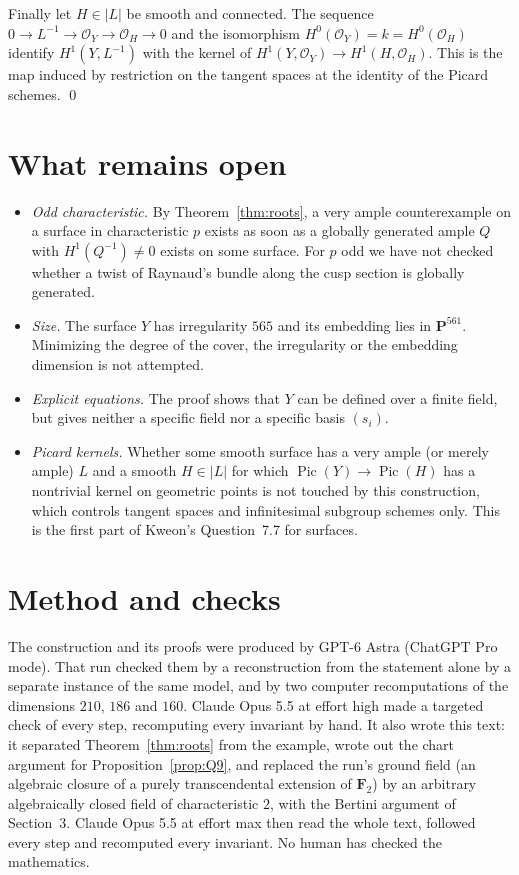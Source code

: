 \documentclass[11pt,a4paper]{article}
\theoremstyle{plain}
\theoremstyle{remark}
\newcommand{\OO}{\mathcal O}
\newcommand{\F}{\mathbf F}
\newcommand{\PP}{\mathbf P}
\newcommand{\Pic}{\operatorname{Pic}}
\begin{document}
Finally let $H\in|L|$ be smooth and connected. The sequence $0\to L^{-1}\to\OO_Y\to\OO_H\to0$ and the isomorphism
$H^0(\OO_Y)=k=H^0(\OO_H)$ identify $H^1(Y,L^{-1})$ with the kernel of $H^1(Y,\OO_Y)\to H^1(H,\OO_H)$. This is the map
induced by restriction on the tangent spaces at the identity of the Picard schemes. \qed

\section{What remains open}

\begin{itemize}
\item \emph{Odd characteristic.} By Theorem~\ref{thm:roots}, a very ample counterexample on a surface in characteristic
$p$ exists as soon as a globally generated ample $Q$ with $H^1(Q^{-1})\ne0$ exists on some surface. For $p$ odd we have
not checked whether a twist of Raynaud's bundle along the cusp section is globally generated.
\item \emph{Size.} The surface $Y$ has irregularity $565$ and its embedding lies in $\PP^{561}$. Minimizing the degree
of the cover, the irregularity or the embedding dimension is not attempted.
\item \emph{Explicit equations.} The proof shows that $Y$ can be defined over a finite field, but gives neither a
specific field nor a specific basis $(s_i)$.
\item \emph{Picard kernels.} Whether some smooth surface has a very ample (or merely ample) $L$ and a smooth
$H\in|L|$ for which $\Pic(Y)\to\Pic(H)$ has a nontrivial kernel on geometric points is not touched by this
construction, which controls tangent spaces and infinitesimal subgroup schemes only. This is the first part of
Kweon's Question~7.7 \cite[p.~19]{Kweon} for surfaces.
\end{itemize}

\section*{Method and checks}

The construction and its proofs were produced by GPT-6 Astra (ChatGPT Pro mode). That run checked them by a
reconstruction from the statement alone by a separate instance of the same model, and by two computer recomputations
of the dimensions $210$, $186$ and $160$. Claude Opus 5.5 at effort high made a targeted check of every step, recomputing
every invariant by hand. It also wrote this text: it separated Theorem~\ref{thm:roots} from the example, wrote out the
chart argument for Proposition~\ref{prop:Q9}, and replaced the run's ground field (an algebraic closure of a purely
transcendental extension of $\F_2$) by an arbitrary algebraically closed field of characteristic $2$, with the Bertini
argument of Section~3. Claude Opus 5.5 at effort max then read the whole text, followed every step and
recomputed every invariant. No human has checked the mathematics.
\end{document}
